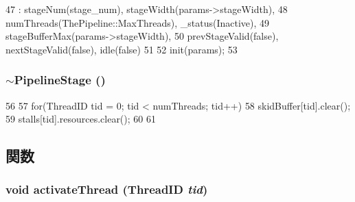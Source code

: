 \begin{DoxyCode}
47     : stageNum(stage_num), stageWidth(params->stageWidth),
48       numThreads(ThePipeline::MaxThreads), _status(Inactive),
49       stageBufferMax(params->stageWidth),
50       prevStageValid(false), nextStageValid(false), idle(false)
51 {
52     init(params);
53 }
\end{DoxyCode}
\hypertarget{classPipelineStage_a5045b86dad0c4a626861dc2aa1c59180}{
\subsubsection[{$\sim$PipelineStage}]{\setlength{\rightskip}{0pt plus 5cm}$\sim${\bf PipelineStage} ()}}
\label{classPipelineStage_a5045b86dad0c4a626861dc2aa1c59180}



\begin{DoxyCode}
56 {
57    for(ThreadID tid = 0; tid < numThreads; tid++) {
58        skidBuffer[tid].clear();
59        stalls[tid].resources.clear();
60    }
61 }
\end{DoxyCode}


\subsection{関数}
\hypertarget{classPipelineStage_a687aa4600423bb30ecf3bb1da6cd6000}{
\subsubsection[{activateThread}]{\setlength{\rightskip}{0pt plus 5cm}void activateThread ({\bf ThreadID} {\em tid})}}
\label{classPipelineStage_a687aa4600423bb30ecf3bb1da6cd6000}



